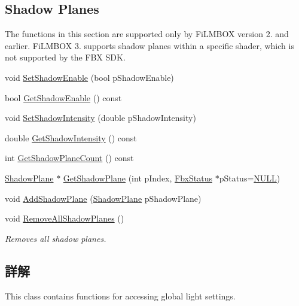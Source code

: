 \subsection*{Shadow Planes}
\label{_amgrp417ef26c4f8335433984ca856eab8c61}%
The functions in this section are supported only by Fi\+L\+M\+B\+OX version 2. and earlier. Fi\+L\+M\+B\+OX 3. supports shadow planes within a specific shader, which is not supported by the F\+BX S\+DK. \begin{DoxyCompactItemize}
\item 
void \hyperlink{class_fbx_global_light_settings_a0e50d74c9f7f9be8446dde2e8c42ea31}{Set\+Shadow\+Enable} (bool p\+Shadow\+Enable)
\item 
bool \hyperlink{class_fbx_global_light_settings_afd139497270cca9fd2deaa03e2ec1fe7}{Get\+Shadow\+Enable} () const
\item 
void \hyperlink{class_fbx_global_light_settings_a6835a1d9ee52474a1c5c52dc855a1ba9}{Set\+Shadow\+Intensity} (double p\+Shadow\+Intensity)
\item 
double \hyperlink{class_fbx_global_light_settings_a86101dda291ce7b103a7fe77ecb0a876}{Get\+Shadow\+Intensity} () const
\item 
int \hyperlink{class_fbx_global_light_settings_ac859310b4945161a224a512b1de5288d}{Get\+Shadow\+Plane\+Count} () const
\item 
\hyperlink{struct_fbx_global_light_settings_1_1_shadow_plane}{Shadow\+Plane} $\ast$ \hyperlink{class_fbx_global_light_settings_aa4eb1de6e7b85273bb761b4dfc782d1d}{Get\+Shadow\+Plane} (int p\+Index, \hyperlink{class_fbx_status}{Fbx\+Status} $\ast$p\+Status=\hyperlink{fbxarch_8h_a070d2ce7b6bb7e5c05602aa8c308d0c4}{N\+U\+LL})
\item 
void \hyperlink{class_fbx_global_light_settings_aeaceb6574694ab589f88f8a100fea9f0}{Add\+Shadow\+Plane} (\hyperlink{struct_fbx_global_light_settings_1_1_shadow_plane}{Shadow\+Plane} p\+Shadow\+Plane)
\item 
void \hyperlink{class_fbx_global_light_settings_af46551f80ebf82ab4d9d338ba41fce8c}{Remove\+All\+Shadow\+Planes} ()
\begin{DoxyCompactList}\small\item\em Removes all shadow planes. \end{DoxyCompactList}\end{DoxyCompactItemize}


\subsection{詳解}
This class contains functions for accessing global light settings.

